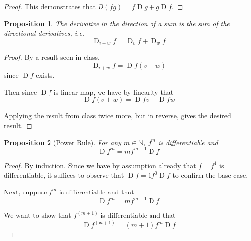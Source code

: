 \documentclass[letterpaper,11pt]{article}
\newtheorem{prop}{Proposition}
\DeclareMathOperator{\D}{D}
\newcommand{\N}{\mathbb{N}}
\begin{document}
\begin{enumerate}
\begin{proof}
            This demonstrates that $D{(fg)} = f \D g + g \D f$.
        \end{proof}

        \begin{prop}
            The derivative in the direction of a sum is the sum of the
            directional derivatives, i.e.
            \begin{equation*}
                \D_{v + w} f = \D_v f + \D_w f
            \end{equation*}
        \end{prop}

        \begin{proof}
            By a result seen in class,
            \begin{equation*}
                \D_{v+w} f = \D{f} (v + w)
            \end{equation*}
            since $\D f$ exists.

            Then since $\D{f}$ is linear map, we have by linearity that
            \begin{equation*}
                \D{f} (v + w) = \D{f} v + \D{f} w
            \end{equation*}

            Applying the result from class twice more, but in reverse, gives
            the desired result.
        \end{proof}

        \begin{prop}[Power Rule]
            For any $m \in \N$, $f^m$ is differentiable and
            \begin{equation*}
                \D{f^m} = m f^{m-1} \D f
            \end{equation*}
        \end{prop}

        \begin{proof}
            By induction. Since we have by assumption already that $f = f^1$ is
            differentiable, it suffices to observe that $\D{f} = 1 f^0 \D{f}$
            to confirm the base case.

            Next, suppose $f^m$ is differentiable and that
            \begin{equation*}
                \D{f^m} = m f^{m-1} \D{f}
            \end{equation*}

            We want to show that $f^{(m+1)}$ is differentiable and that
            \begin{equation*}
                \D{f^{(m+1)}} = (m+1) f^m \D{f}
            \end{equation*}


\end{proof}
\end{enumerate}
\end{document}
